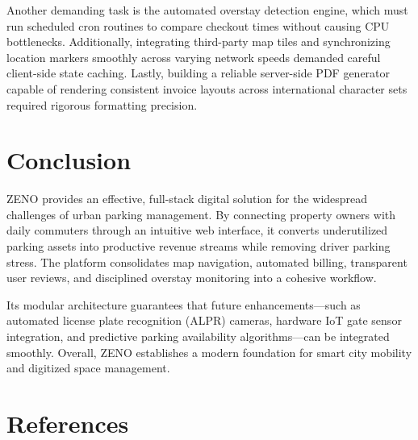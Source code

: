 \documentclass[12pt,a4paper]{article}
\begin{document}
Another demanding task is the automated overstay detection engine, which must run scheduled cron routines to compare checkout times without causing CPU bottlenecks. Additionally, integrating third-party map tiles and synchronizing location markers smoothly across varying network speeds demanded careful client-side state caching. Lastly, building a reliable server-side PDF generator capable of rendering consistent invoice layouts across international character sets required rigorous formatting precision.

\vspace{-0.4cm}
\section{Conclusion}

ZENO provides an effective, full-stack digital solution for the widespread challenges of urban parking management. By connecting property owners with daily commuters through an intuitive web interface, it converts underutilized parking assets into productive revenue streams while removing driver parking stress. The platform consolidates map navigation, automated billing, transparent user reviews, and disciplined overstay monitoring into a cohesive workflow. 

Its modular architecture guarantees that future enhancements—such as automated license plate recognition (ALPR) cameras, hardware IoT gate sensor integration, and predictive parking availability algorithms—can be integrated smoothly. Overall, ZENO establishes a modern foundation for smart city mobility and digitized space management.

\vspace{-0.4cm}
\section{References}
\end{document}
